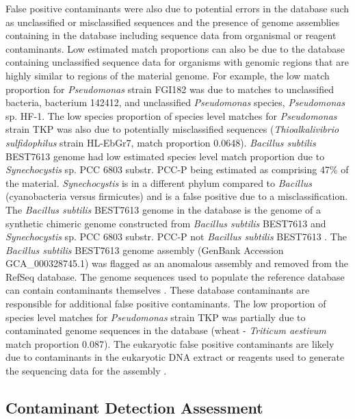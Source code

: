 \documentclass[fleqn,10pt,lineno]{wlpeerj}\usepackage[]{graphicx}\usepackage[]{color}
\begin{document}
False positive contaminants were also due to potential errors in the database such as unclassified or misclassified sequences and the presence of genome assemblies containing in the database including sequence data from organismal or reagent contaminants.
Low estimated match proportions can also be due to the database containing unclassified sequence data for organisms with genomic regions that are highly similar to regions of the material genome.
For example, the low match proportion for \textit{Pseudomonas} strain FGI182 was due to matches to unclassified bacteria, bacterium 142412, and unclassified \textit{Pseudomonas} species, \textit{Pseudomonas} sp. HF-1.
The low species proportion of species level matches for \textit{Pseudomonas} strain TKP was also due to potentially misclassified sequences (\textit{Thioalkalivibrio sulfidophilus} strain HL-EbGr7, match proportion 0.0648).
\textit{Bacillus subtilis} BEST7613 genome had low estimated species level match proportion due to \textit{Synechocystis} sp. PCC 6803 substr. PCC-P being estimated as comprising 47\% of the material.
\textit{Synechocystis} is in a different phylum compared to \textit{Bacillus} (cyanobacteria versus firmicutes) and is a false positive due to a misclassification.
The \textit{Bacillus subtilis} BEST7613 genome in the database is the genome of a synthetic chimeric genome constructed from \textit{Bacillus subtilis} BEST7613 and \textit{Synechocystis} sp. PCC 6803 substr. PCC-P not \textit{Bacillus subtilis} BEST7613 \citep{watanabe2012complete}. 
The \textit{Bacillus subtilis} BEST7613 genome assembly (GenBank Accession GCA\_000328745.1) was flagged as an anomalous assembly and removed from the RefSeq database.  
The genome sequences used to populate the reference database can contain contaminants themselves \citep{parks2015checkm}.
These database contaminants are responsible for additional false positive contaminants.
The low proportion of species level matches for \textit{Pseudomonas} strain TKP was partially due to contaminated genome sequences in the database (wheat - \textit{Triticum aestivum} match proportion 0.087).
The eukaryotic false positive contaminants are likely due to contaminants in the eukaryotic DNA extract or reagents used to generate the sequencing data for the assembly \citep{parks2015checkm}.

\subsection*{Contaminant Detection Assessment}
\end{document}
